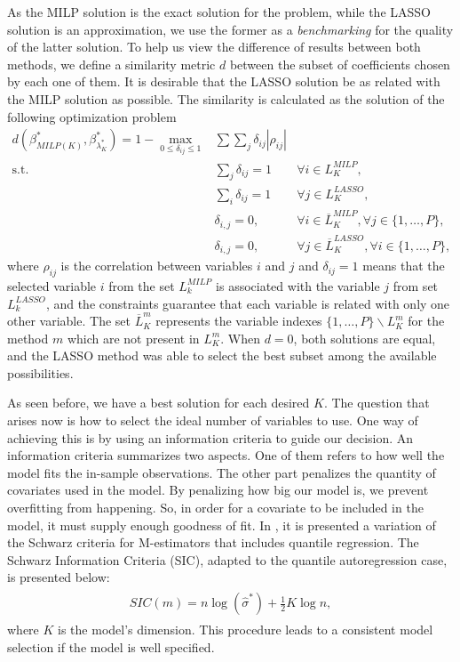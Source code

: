 As the MILP solution is the exact solution for the problem, while the LASSO solution is an approximation, we use the former as a \textit{benchmarking} for the quality of the latter solution. To help us view the difference of results between both methods, we define a similarity metric $d$ between the subset of coefficients chosen by each one of them. It is desirable that the LASSO solution be as related with the MILP solution as possible.
The similarity is calculated as the solution of the following optimization problem
\begin{eqnarray}
d(\beta^*_{MILP(K)}, \beta^*_{\lambda^*_K}) =	1 - \max_{0\leq\delta_{ij}\leq1} & \sum\sum_{j} \delta_{ij} |\rho_{ij}| \label{eq:metricad0} \\
\text{s.t.} & \sum_{j}\delta_{ij}=1 & \forall i\in L_{K}^{MILP},\\
& \sum_{i}\delta_{ij}=1 & \forall j\in L_{K}^{LASSO},\\
& \delta_{i,j} = 0, & \forall i \in \overline{L}_{K}^{MILP}, \forall j \in \{1,\dots,P\},\\
& \delta_{i,j} = 0, & \forall j \in \overline{L}_{K}^{LASSO}, \forall i \in \{1,\dots,P\},\label{eq:metricad4}
\end{eqnarray}
where $\rho_{ij}$ is the correlation between variables $i$ and $j$ and $\delta_{ij} = 1$ means that the selected variable $i$ from the set $L_k^{MILP}$ is associated with the variable $j$ from set $L_k^{LASSO}$, and the constraints guarantee that each variable is related with only one other variable. The set $\overline{L}_K^{m}$ represents the variable indexes $\{1,\dots,P\} \backslash {L}_K^{m}$ for the method $m$ which are not present in ${L}_K^{m}$.
When $d = 0$, both solutions are equal, and the LASSO method was able to select the best subset among the available possibilities.




As seen before, we have a best solution for each desired $K$. The question that arises now is how to select the ideal number of variables to use.
One way of achieving this is by using an information criteria to guide our decision. 
An information criteria summarizes two aspects. One of them refers to how well the model fits the in-sample observations. The other part penalizes the quantity of covariates used in the model. By penalizing how big our model is, we prevent overfitting from happening. So, in order for a covariate to be included in the model, it must supply enough goodness of fit.
In \cite{machado1993robust}, it is presented a variation of the Schwarz criteria for M-estimators that includes quantile regression. The Schwarz Information Criteria (SIC), adapted to the quantile autoregression case, is presented below:
\begin{align} 
\begin{split}
SIC(m) = n \log(\hat{\sigma}^*)+\frac{1}{2}K\log n,\label{eq:SIC}
\end{split}					
\end{align}
where $K$ is the model's dimension. This procedure leads to a consistent model selection if the model is well specified. 

